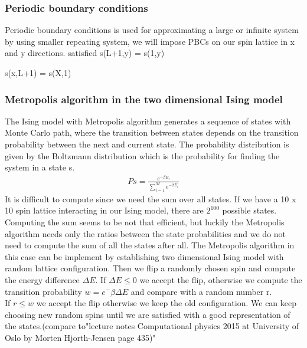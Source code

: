 \documentclass[10pt,a4paper]{article}
\begin{document}
  \subsubsection{Periodic boundary conditions} 
Periodic boundary conditions is used for approximating a large or infinite system by using smaller repeating system, we will impose PBCs on our spin lattice in x and y directions.
satisfied
 s(L+1,y) = s(1,y)
 
 s(x,L+1) = s(X,1)  

\subsubsection{Metropolis algorithm in the two dimensional Ising model}
The Ising model with Metropolis algorithm generates a sequence of states with Monte Carlo path, where the transition between states depends on the transition probability between the next and current state. The probability distribution is given by the Boltzmann distribution which is the probability for finding the system in a state s.
\begin{align}
Ps =\frac{ e^{- \beta E_i}}{\sum_{i=1}^{M}e^{- \beta E_i}}
\end{align}
It is difficult to compute since we need the sum over all states. If we have a 10 x 10 spin lattice interacting in our Ising model, there are $2^{100}$ possible states. Computing the sum seems to be not that efficient, but luckily the Metropolis algorithm needs only the ratios between the state probabilities and we do not need to compute the sum of all the states after all. The Metropolis algorithm in this case can be implement by establishing two dimensional Ising model with random lattice configuration. Then we flip a randomly chosen spin and compute the energy difference $\Delta E$. If $\Delta E \leq 0$ we accept the flip, otherwise we compute the transition probability $w = e^-{\beta \Delta E}$ and compare with a random number r.\\If $r \leq w$ we accept the flip otherwise we keep the old configuration. We can keep choosing new random spins until we are satisfied with a good representation of the states.(compare to"lecture notes Computational physics 2015 at University of Oslo by Morten Hjorth-Jensen page 435)"   
\end{document}
